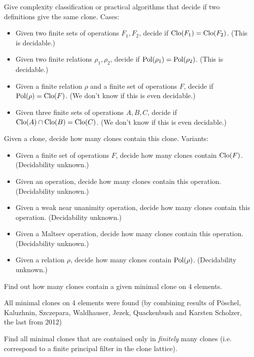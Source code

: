 \begin{question}
  Give complexity classification or practical algorithms that decide if two definitions give the same clone. Cases:
  \begin{itemize}
    \item Given two finite sets of operations $F_1, F_2$, decide if
      $\operatorname{Clo}(F_1)=\operatorname{Clo}(F_2)$. (This is decidable.)
    \item Given two finite relations $\rho_1, \rho_2$, decide if
      $\operatorname{Pol}(\rho_1)=\operatorname{Pol}(\rho_2)$. (This is decidable.)
    \item Given a finite relation $\rho$ and a finite set of operations $F$,
      decide if $\operatorname{Pol}(\rho)=\operatorname{Clo}(F)$. (We don't know if this is even
      decidable.)
    \item Given three finite sets of operations $A, B, C$, decide if 
      $\operatorname{Clo}(A)\cap \operatorname{Clo}(B)=\operatorname{Clo}(C)$. (We don't know if this is even
      decidable.)
  \end{itemize}
\end{question}

\begin{question}
  Given a clone, decide how many clones contain this clone. Variants:
\begin{itemize}
    \item Given a finite set of operations $F$, decide how many clones contain
      $\operatorname{Clo}(F)$. (Decidability unknown.)
    \item Given an operation, decide how many clones contain this operation.
      (Decidability unknown.)
    \item Given a weak near unanimity operation, decide how many clones contain this operation.
      (Decidability unknown.)
    \item Given a Maltsev operation, decide how many clones contain this operation.
      (Decidability unknown.)
    \item Given a relation $\rho$, decide how many clones contain $\operatorname{Pol}(\rho)$.
      (Decidability unknown.)
  \end{itemize}
\end{question}

\begin{question}
  Find out how many clones contain a given minimal clone on 4 elements.
\end{question}
\begin{context}
All minimal clones on 4 elements were found (by combining results of 
P\"oschel, Kaluzhnin, Szczepara, Waldhauser, Jezek, Quackenbush and Karsten
Scholzer, the last from 2012)
\end{context}
\begin{question}
  Find all minimal clones that are contained only in \emph{finitely} many clones (i.e.
  correspond to a finite principal filter in the clone lattice).
\end{question}

